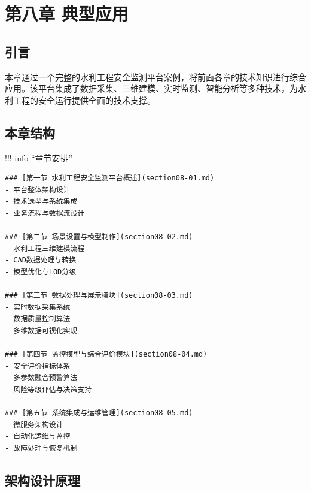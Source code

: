 \hypertarget{ux7b2cux516bux7ae0-ux5178ux578bux5e94ux7528}{%
\section{第八章 典型应用}\label{ux7b2cux516bux7ae0-ux5178ux578bux5e94ux7528}}


\hypertarget{ux5f15ux8a00}{%
\subsection{引言}\label{ux5f15ux8a00}}

本章通过一个完整的水利工程安全监测平台案例，将前面各章的技术知识进行综合应用。该平台集成了数据采集、三维建模、实时监测、智能分析等多种技术，为水利工程的安全运行提供全面的技术支撑。

\hypertarget{ux672cux7ae0ux7ed3ux6784}{%
\subsection{本章结构}\label{ux672cux7ae0ux7ed3ux6784}}

!!! info ``章节安排''

\begin{verbatim}
### [第一节 水利工程安全监测平台概述](section08-01.md)
- 平台整体架构设计
- 技术选型与系统集成
- 业务流程与数据流设计

### [第二节 场景设置与模型制作](section08-02.md)
- 水利工程三维建模流程
- CAD数据处理与转换
- 模型优化与LOD分级

### [第三节 数据处理与展示模块](section08-03.md)
- 实时数据采集系统
- 数据质量控制算法
- 多维数据可视化实现

### [第四节 监控模型与综合评价模块](section08-04.md)
- 安全评价指标体系
- 多参数融合预警算法
- 风险等级评估与决策支持

### [第五节 系统集成与运维管理](section08-05.md)
- 微服务架构设计
- 自动化运维与监控
- 故障处理与恢复机制
\end{verbatim}

\hypertarget{ux67b6ux6784ux8bbeux8ba1ux539fux7406}{%
\subsection{架构设计原理}\label{ux67b6ux6784ux8bbeux8ba1ux539fux7406}}

